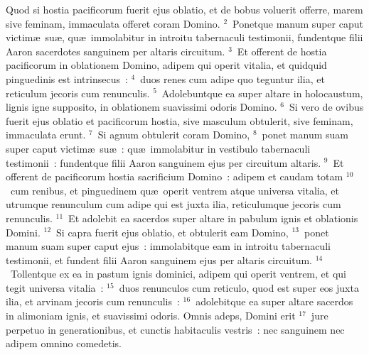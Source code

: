 \lettrine[lines=3,image=true,loversize=0.05,lraise=-0.03]{Q}{}uod si hostia pacificorum fuerit ejus oblatio, et de bobus voluerit offerre, marem sive feminam, immaculata offeret coram Domino.
${}^{2}$~Ponetque manum super caput victim\ae\ su\ae , qu\ae\ immolabitur in introitu tabernaculi testimonii, fundentque filii Aaron sacerdotes sanguinem per altaris circuitum.
${}^{3}$~Et offerent de hostia pacificorum in oblationem Domino, adipem qui operit vitalia, et quidquid pinguedinis est intrinsecus~:
${}^{4}$~duos renes cum adipe quo teguntur ilia, et reticulum jecoris cum renunculis.
${}^{5}$~Adolebuntque ea super altare in holocaustum, lignis igne supposito, in oblationem suavissimi odoris Domino.
${}^{6}$~Si vero de ovibus fuerit ejus oblatio et pacificorum hostia, sive masculum obtulerit, sive feminam, immaculata erunt.
${}^{7}$~Si agnum obtulerit coram Domino,
${}^{8}$~ponet manum suam super caput victim\ae\ su\ae~: qu\ae\ immolabitur in vestibulo tabernaculi testimonii~: fundentque filii Aaron sanguinem ejus per circuitum altaris.
${}^{9}$~Et offerent de pacificorum hostia sacrificium Domino~: adipem et caudam totam
${}^{10}$~cum renibus, et pinguedinem qu\ae\ operit ventrem atque universa vitalia, et utrumque renunculum cum adipe qui est juxta ilia, reticulumque jecoris cum renunculis.
${}^{11}$~Et adolebit ea sacerdos super altare in pabulum ignis et oblationis Domini.
${}^{12}$~Si capra fuerit ejus oblatio, et obtulerit eam Domino,
${}^{13}$~ponet manum suam super caput ejus~: immolabitque eam in introitu tabernaculi testimonii, et fundent filii Aaron sanguinem ejus per altaris circuitum.
${}^{14}$~Tollentque ex ea in pastum ignis dominici, adipem qui operit ventrem, et qui tegit universa vitalia~:
${}^{15}$~duos renunculos cum reticulo, quod est super eos juxta ilia, et arvinam jecoris cum renunculis~:
${}^{16}$~adolebitque ea super altare sacerdos in alimoniam ignis, et suavissimi odoris. Omnis adeps, Domini erit
${}^{17}$~jure perpetuo in generationibus, et cunctis habitaculis vestris~: nec sanguinem nec adipem omnino comedetis.

